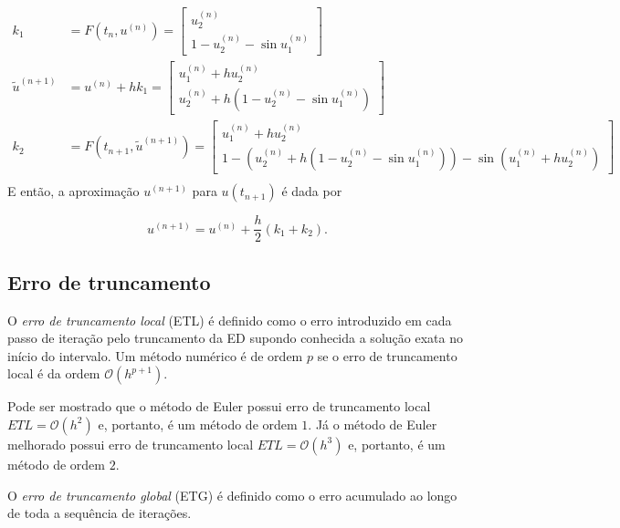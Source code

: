 \documentclass{article}
\begin{document}
\begin{align*}
    k_1 &= F(t_n, u^{(n)}) = \begin{bmatrix}
        u_{2}^{(n)} \\
        1 - u_{2}^{(n)} - \sin u_{1}^{(n)}
    \end{bmatrix}
    \\
    \tilde{u}^{(n+1)} &= u^{(n)} + hk_1 = \begin{bmatrix}
        u_{1}^{(n)} + h u_{2}^{(n)} \\
        u_{2}^{(n)} + h (1 - u_{2}^{(n)} - \sin u_{1}^{(n)})
    \end{bmatrix}
    \\
    k_2 &= F(t_{n+1}, \tilde{u}^{(n+1)}) = \begin{bmatrix}
        u_{1}^{(n)} + h u_{2}^{(n)} \\
        1 - (u_{2}^{(n)} + h (1 - u_{2}^{(n)} - \sin u_{1}^{(n)})) - \sin(u_{1}^{(n)} + h u_{2}^{(n)})
    \end{bmatrix}
    \\
\end{align*}
E então, a aproximação \(u^{(n+1)}\) para \(u(t_{n+1})\) é dada por

\begin{equation}
    u^{(n+1)} = u^{(n)} + \frac{h}{2} (k_1 + k_2).
\end{equation}

\subsection{Erro de truncamento}

\begin{defn}
    O \emph{erro de truncamento local} (ETL) é definido como o erro introduzido em cada passo de iteração pelo truncamento da ED supondo conhecida a solução exata no início do intervalo. Um método numérico é de ordem \(p\) se o erro de truncamento local é da ordem \(\mathcal{O}(h^{p+1})\).
\end{defn}

Pode ser mostrado que o método de Euler possui erro de truncamento local \(ETL = \mathcal{O}(h^2)\) e, portanto, é um método de ordem \(1\). Já o método de Euler melhorado possui erro de truncamento local \(ETL = \mathcal{O}(h^3)\) e, portanto, é um método de ordem \(2\).

\begin{defn}
    O \emph{erro de truncamento global} (ETG) é definido como o erro acumulado ao longo de toda a sequência de iterações.
\end{defn}
\end{document}
